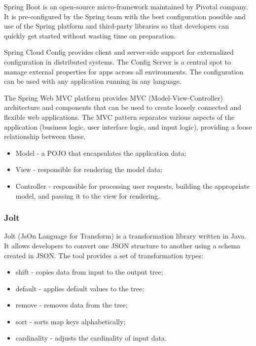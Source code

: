 Spring Boot is an open-source micro-framework maintained by Pivotal company. It is pre-configured by the Spring team with the best configuration possible and use of the Spring platform and third-party libraries so that developers can quickly get started without wasting time on preparation.~\cite{spring-boot}

Spring Cloud Config provides client and server-side support for externalized configuration in distributed systems. The Config Server is a central spot to manage external properties for apps across all environments. The configuration can be used with any application running in any language.~\cite{spring-cloud-config}

The Spring Web MVC platform provides MVC (Model-View-Controller) architecture and components that can be used to create loosely connected and flexible web applications. The MVC pattern separates various aspects of the application (business logic, user interface logic, and input logic), providing a loose relationship between these.~\cite{spring-mvc}

\begin{itemize}
    \item Model - a POJO that encapsulates the application data;
    \item View - responsible for rendering the model data;
    \item Controller - responsible for processing user requests, building the appropriate model, and passing it to the view for rendering.
\end{itemize}

\subsubsection{Jolt}
Jolt (JsOn Language for Transform) is a transformation library written in Java. It allows developers to convert one JSON structure to another using a schema created in JSON. The tool provides a set of transformation types:

\begin{itemize}
    \item shift - copies data from input to the output tree;
    \item default - applies default values to the tree;
    \item remove - removes data from the tree;
    \item sort - sorts map keys alphabetically;
    \item cardinality - adjusts the cardinality of input data.
\end{itemize}

